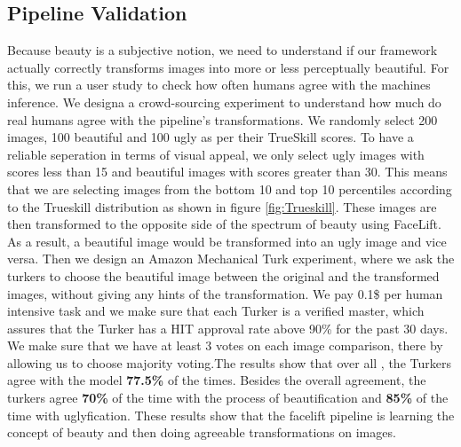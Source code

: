 \subsection{Pipeline Validation}
Because beauty is a subjective notion, we need to understand if our framework actually correctly transforms images into more or less perceptually beautiful. For this, we run a user study to check how often humans agree with the machines inference. We designa a  crowd-sourcing experiment to understand how much do real humans agree with the pipeline's transformations.
We randomly select 200 images, 100 beautiful  and 100 ugly as per their TrueSkill scores. To have a reliable seperation in terms of visual appeal, we only select ugly images with scores less than 15 and beautiful images with scores greater than 30. This means that we are selecting images from the bottom 10 and top 10 percentiles according to the Trueskill distribution as shown in figure \ref{fig:Trueskill}. These images are then transformed to the opposite side of the spectrum of beauty using FaceLift. As a result, a beautiful image would be transformed into an ugly image and vice versa. Then we design an Amazon Mechanical Turk experiment, where we ask the turkers to choose the beautiful image between the original and the transformed images, without giving any hints of the transformation. We pay 0.1\$ per human intensive task and we make sure that each Turker is a verified master, which assures that the Turker has a HIT approval rate above 90\% for the past 30 days. We make sure that we have at least 3 votes on each image comparison, there by allowing us to choose majority voting.The results show that over all , the Turkers agree with the model \textbf{77.5\%} of the times. Besides the overall agreement, the turkers agree \textbf{70\%} of the time with the process of beautification and \textbf{85\%} of the time with uglyfication. These results show that the facelift pipeline is learning the concept of beauty and then doing agreeable transformations on images.  
